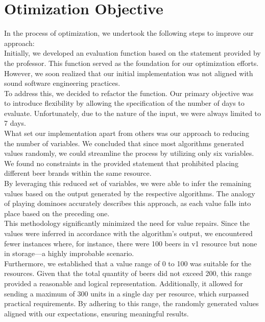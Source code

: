\newpage

\section{Otimization Objective}


\quad In the process of optimization, we undertook the following steps to improve our approach:\\


Initially, we developed an evaluation function based on the statement provided by the professor. This function served as the foundation for our optimization efforts. However, we soon realized that our initial implementation was not aligned with sound software engineering practices.\\


To address this, we decided to refactor the function. Our primary objective was to introduce flexibility by allowing the specification of the number of days to evaluate. Unfortunately, due to the nature of the input, we were always limited to 7 days.\\



What set our implementation apart from others was our approach to reducing the number of variables. We concluded that since most algorithms generated values randomly, we could streamline the process by utilizing only six variables. 
We found no constraints in the provided statement that prohibited placing different beer brands within the same resource.\\


By leveraging this reduced set of variables, we were able to infer the remaining values based on the output generated by the respective algorithms. 
The analogy of playing dominoes accurately describes this approach, as each value falls into place based on the preceding one.\\


This methodology significantly minimized the need for value repairs. 
Since the values were inferred in accordance with the algorithm's output, we encountered fewer instances where, for instance, there were 100 beers in v1 resource but none in storage—a highly improbable scenario.\\


Furthermore, we established that a value range of 0 to 100 was suitable for the resources. Given that the total quantity of beers did not exceed 200, this range provided a reasonable and logical representation. Additionally, it allowed for sending a maximum of 300 units in a single day per resource, which surpassed practical requirements. By adhering to this range, the randomly generated values aligned with our expectations, ensuring meaningful results.\\


